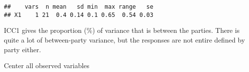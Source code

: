 \documentclass[
]{article}
\newenvironment{Shaded}{\begin{snugshade}}{\end{snugshade}}
\newcommand{\CommentTok}[1]{\textcolor[rgb]{0.56,0.35,0.01}{\textit{#1}}}
\newcommand{\DataTypeTok}[1]{\textcolor[rgb]{0.13,0.29,0.53}{#1}}
\newcommand{\DecValTok}[1]{\textcolor[rgb]{0.00,0.00,0.81}{#1}}
\newcommand{\KeywordTok}[1]{\textcolor[rgb]{0.13,0.29,0.53}{\textbf{#1}}}
\newcommand{\NormalTok}[1]{#1}
\newcommand{\OperatorTok}[1]{\textcolor[rgb]{0.81,0.36,0.00}{\textbf{#1}}}
\newcommand{\StringTok}[1]{\textcolor[rgb]{0.31,0.60,0.02}{#1}}
\begin{document}
\begin{Shaded}
\end{Shaded}

\begin{verbatim}
##    vars  n mean   sd min  max range   se
## X1    1 21  0.4 0.14 0.1 0.65  0.54 0.03
\end{verbatim}

\begin{Shaded}
\end{Shaded}

ICC1 gives the proportion (\%) of variance that is between the parties.
There is quite a lot of between-party variance, but the responses are
not entire defined by party either.

Center all observed variables
\end{document}
